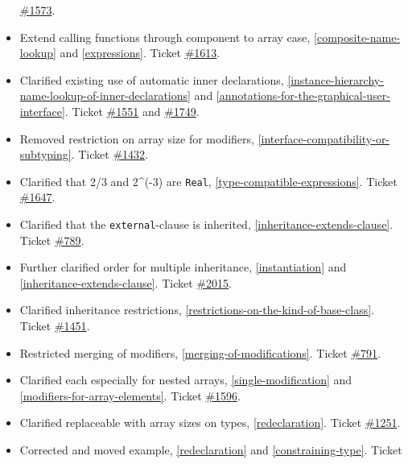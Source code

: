 \begin{itemize}
  \href{https://github.com/modelica/ModelicaSpecification/issues/1573}{\#1573}.
\item
  Extend calling functions through component to array case, \cref{composite-name-lookup} and \cref{expressions}. Ticket
  \href{https://github.com/modelica/ModelicaSpecification/issues/1613}{\#1613}.
\item
  Clarified existing use of automatic inner declarations, \cref{instance-hierarchy-name-lookup-of-inner-declarations}
  and \cref{annotations-for-the-graphical-user-interface}. Ticket
  \href{https://github.com/modelica/ModelicaSpecification/issues/1551}{\#1551} and
  \href{https://github.com/modelica/ModelicaSpecification/issues/1749}{\#1749}.
\item
  Removed restriction on array size for modifiers, \cref{interface-compatibility-or-subtyping}. Ticket
  \href{https://github.com/modelica/ModelicaSpecification/issues/1432}{\#1432}.
\item
  Clarified that 2/3 and 2\^{}(-3) are \lstinline!Real!, \cref{type-compatible-expressions}.
  Ticket \href{https://github.com/modelica/ModelicaSpecification/issues/1647}{\#1647}.
\item
  Clarified that the \lstinline!external!-clause is inherited, \cref{inheritance-extends-clause}.
  Ticket \href{https://github.com/modelica/ModelicaSpecification/issues/789}{\#789}.
\item
  Further clarified order for multiple inheritance, \cref{instantiation} and
  \cref{inheritance-extends-clause}. Ticket
  \href{https://github.com/modelica/ModelicaSpecification/issues/2015}{\#2015}.
\item
  Clarified inheritance restrictions, \cref{restrictions-on-the-kind-of-base-class}.
  Ticket \href{https://github.com/modelica/ModelicaSpecification/issues/1451}{\#1451}.
\item
  Restricted merging of modifiers, \cref{merging-of-modifications}. Ticket
  \href{https://github.com/modelica/ModelicaSpecification/issues/791}{\#791}.
\item
  Clarified each especially for nested arrays, \cref{single-modification} and \cref{modifiers-for-array-elements}.
  Ticket \href{https://github.com/modelica/ModelicaSpecification/issues/1596}{\#1596}.
\item
  Clarified replaceable with array sizes on types, \cref{redeclaration}. Ticket
  \href{https://github.com/modelica/ModelicaSpecification/issues/1251}{\#1251}.
\item
  Corrected and moved example, \cref{redeclaration} and \cref{constraining-type}. Ticket

\end{itemize}
